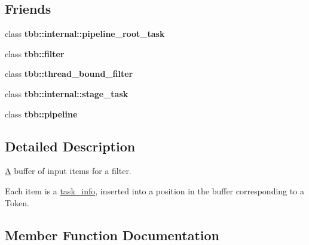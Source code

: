\subsection*{Friends}
\begin{DoxyCompactItemize}
\item 
\hypertarget{classtbb_1_1internal_1_1input__buffer_aab9072b4c6b60c30ed1b6836ecbdb1dd}{}class {\bfseries tbb\+::internal\+::pipeline\+\_\+root\+\_\+task}\label{classtbb_1_1internal_1_1input__buffer_aab9072b4c6b60c30ed1b6836ecbdb1dd}

\item 
\hypertarget{classtbb_1_1internal_1_1input__buffer_a7a627b425137e322e65a3717083b47dc}{}class {\bfseries tbb\+::filter}\label{classtbb_1_1internal_1_1input__buffer_a7a627b425137e322e65a3717083b47dc}

\item 
\hypertarget{classtbb_1_1internal_1_1input__buffer_af76e996f37276bc9cfb68512fd062e26}{}class {\bfseries tbb\+::thread\+\_\+bound\+\_\+filter}\label{classtbb_1_1internal_1_1input__buffer_af76e996f37276bc9cfb68512fd062e26}

\item 
\hypertarget{classtbb_1_1internal_1_1input__buffer_aeb28b87860f2327802f52303f843eae9}{}class {\bfseries tbb\+::internal\+::stage\+\_\+task}\label{classtbb_1_1internal_1_1input__buffer_aeb28b87860f2327802f52303f843eae9}

\item 
\hypertarget{classtbb_1_1internal_1_1input__buffer_a3abf675c0784d4132ead79be2356a3de}{}class {\bfseries tbb\+::pipeline}\label{classtbb_1_1internal_1_1input__buffer_a3abf675c0784d4132ead79be2356a3de}

\end{DoxyCompactItemize}


\subsection{Detailed Description}
\hyperlink{structA}{A} buffer of input items for a filter. 

Each item is a \hyperlink{structtbb_1_1internal_1_1task__info}{task\+\_\+info}, inserted into a position in the buffer corresponding to a Token. 

\subsection{Member Function Documentation}
\hypertarget{classtbb_1_1internal_1_1input__buffer_a869388f7823ccc3aa2c0a3af60798d1c}{}
